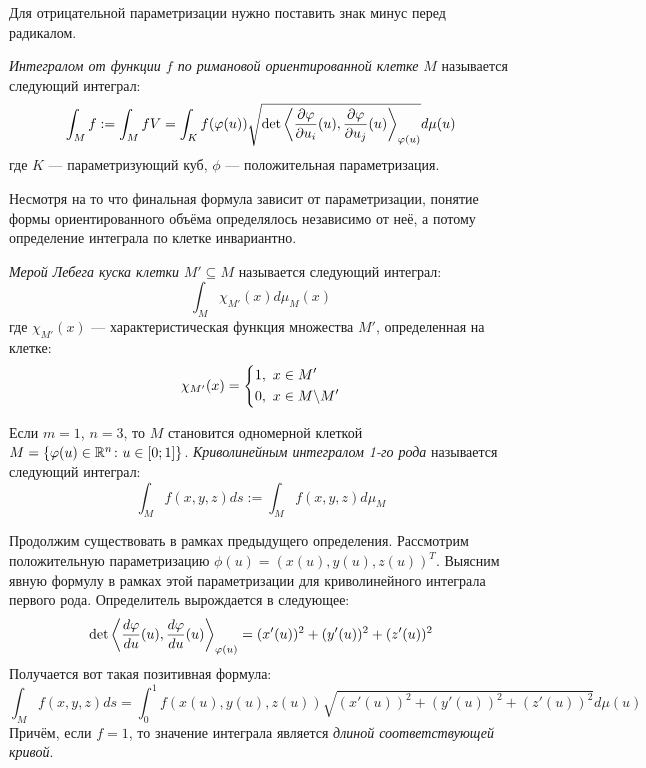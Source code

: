\begin{note}
	Для отрицательной параметризации нужно поставить знак минус перед радикалом.
\end{note}

\begin{definition}
	\textit{Интегралом от функции $f$ по римановой ориентированной клетке} $M$ называется следующий интеграл:
	\[
		\int_M f := \int_M fV = \int_K f(\varphi(u))\sqrt{\det\left\langle\frac{\partial \varphi}{\partial u_i}(u), \frac{\partial \varphi}{\partial u_j}(u)\right\rangle_{\varphi(u)}}d\mu(u)
	\]
	где $K$ --- параметризующий куб, $\phi$ --- положительная параметризация.
\end{definition}

\begin{note}
	Несмотря на то что финальная формула зависит от параметризации, понятие формы ориентированного объёма определялось независимо от неё, а потому определение интеграла по клетке инвариантно.
\end{note}

\begin{definition}
	\textit{Мерой Лебега куска клетки} $M' \subseteq M$ называется следующий интеграл:
	\[
		\int_M \chi_{M'}(x)d\mu_M(x)
	\]
	где $\chi_{M'}(x)$ --- характеристическая функция множества $M'$, определенная на клетке:
	\[
		\chi_{M'}(x) = \left\{ \begin{aligned} 
			&{1,\ x \in M'}
			\\
			&{0,\ x \in M \backslash M'}
		 \end{aligned} \right.
	\]
\end{definition}

\begin{definition}
	Если $m = 1$, $n = 3$, то $M$ становится одномерной клеткой $M = \{\varphi(u) \in \mathbb{R}^n \colon u \in [0; 1]\}$. \textit{Криволинейным интегралом 1-го рода} называется следующий интеграл:
	\[
		\int_M f(x, y, z)ds := \int_M f(x, y, z)d\mu_M
	\]
\end{definition}

\begin{note}
	Продолжим существовать в рамках предыдущего определения. Рассмотрим положительную параметризацию $\phi(u) = (x(u), y(u), z(u))^T$. Выясним явную формулу в рамках этой параметризации для криволинейного интеграла первого рода. Определитель вырождается в следующее:
	\[
		\det\left\langle\frac{d\varphi}{du}(u), \frac{d\varphi}{du}(u)\right\rangle_{\varphi(u)} = (x'(u))^2 + (y'(u))^2 + (z'(u))^2
	\]
	Получается вот такая позитивная формула:
	\[
		\int_M f(x, y, z)ds = \int_0^1 f(x(u), y(u), z(u))\sqrt{(x'(u))^2 + (y'(u))^2 + (z'(u))^2}d\mu(u)
	\]
	Причём, если $f = 1$, то значение интеграла является \textit{длиной соответствующей кривой}.
\end{note}

